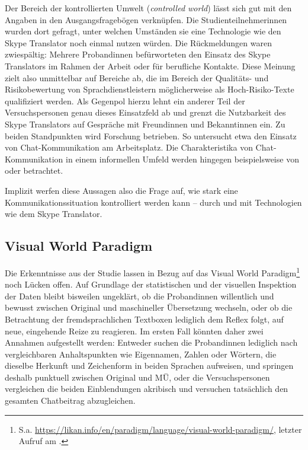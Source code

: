 Der Bereich der kontrollierten Umwelt (\emph{controlled world}) lässt sich gut mit den Angaben in den Ausgangsfragebögen verknüpfen. Die Studienteilnehmer{\textperiodcentered}innen wurden dort gefragt, unter welchen Umständen sie eine Technologie wie den Skype Translator noch einmal nutzen würden. Die Rückmeldungen waren zwiespältig: Mehrere Proband{\textperiodcentered}innen befürworteten den Einsatz des Skype Translators im Rahmen der Arbeit oder für berufliche Kontakte. Diese Meinung zielt also unmittelbar auf Bereiche ab, die im Bereich der Qualitäts- und Risikobewertung von Sprachdienstleistern möglicherweise als Hoch-Risiko-Texte qualifiziert werden. Als Gegenpol hierzu lehnt ein anderer Teil der Versuchspersonen genau dieses Einsatzfeld ab und grenzt die Nutzbarkeit des Skype Translators auf Gespräche mit Freund{\textperiodcentered}innen und Bekannt{\textperiodcentered}innen ein. Zu beiden Standpunkten wird Forschung betrieben. So untersucht \citet{beiswenger_analyse_2017} etwa den Einsatz von Chat-Kommunikation am Arbeitsplatz. Die Charakteristika von Chat-Kommunikation in einem informellen Umfeld werden hingegen beispielsweise von \citet{beiswenger_zu_2017} oder \citet{fiser_whatsapp_2017} betrachtet.

Implizit werfen diese Aussagen also die Frage auf, wie stark eine Kommunikationssituation kontrolliert werden kann -- durch und mit Technologien wie dem Skype Translator.  

\subsection{Visual World Paradigm}\label{K7:para:vwp}
Die Erkenntnisse aus der Studie lassen in Bezug auf das Visual World Paradigm\footnote{S.a. \url{https://likan.info/en/paradigm/language/visual-world-paradigm/}, letzter Aufruf am \datum{}.} noch Lücken offen. Auf Grundlage der statistischen und der visuellen Inspektion der Daten bleibt bisweilen ungeklärt, ob die Proband{\textperiodcentered}innen willentlich und bewusst zwischen Original und maschineller Übersetzung wechseln, oder ob die Betrachtung der fremdsprachlichen Textboxen lediglich dem Reflex folgt, auf neue, eingehende Reize zu reagieren. Im ersten Fall könnten daher zwei Annahmen aufgestellt werden: Entweder suchen die Proband{\textperiodcentered}innen lediglich nach vergleichbaren Anhaltspunkten wie Eigennamen, Zahlen oder Wörtern, die dieselbe Herkunft und Zeichenform in beiden Sprachen aufweisen, und springen deshalb punktuell zwischen Original und MÜ, oder die Versuchspersonen vergleichen die beiden Einblendungen akribisch und versuchen tatsächlich den gesamten Chatbeitrag abzugleichen.

